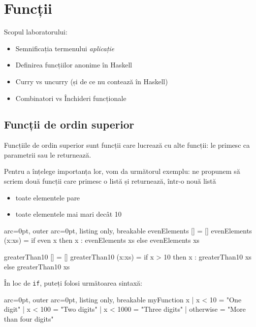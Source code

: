 \section*{ Funcții }

Scopul laboratorului:
\begin{itemize}
	\item  Semnificația termenului \textit{aplicație}
	\item  Definirea funcțiilor anonime în Haskell
	\item  Curry vs uncurry (și de ce nu contează în Haskell)
	\item  Combinatori vs Închideri funcționale
\end{itemize}
\subsection*{ Funcții de ordin superior }

Funcțiile de ordin superior sunt funcții care lucrează cu alte funcții: le primesc ca parametrii sau le returnează.

Pentru a înțelege importanța lor, vom da următorul exemplu: ne propunem să scriem două funcții care primesc o listă și returnează, într-o nouă listă
\begin{itemize}
	\item  toate elementele pare
	\item  toate elementele mai mari decât 10
\end{itemize}


\begin{tcblisting}{ arc=0pt, outer arc=0pt, listing only, breakable}
evenElements [] = []
evenElements (x:xs) = if even x
                      then x : evenElements xs
                      else evenElements xs
                      
greaterThan10 [] = []
greaterThan10 (x:xs) = if x > 10
                       then x : greaterThan10 xs
                       else greaterThan10 xs

\end{tcblisting}


\begin{tcolorbox}[colback=blue!10, colframe=blue!20]
În loc de \texttt{if}, puteți folosi următoarea sintaxă:

\begin{tcblisting}{ arc=0pt, outer arc=0pt, listing only, breakable}
myFunction x
        | x < 10    = "One digit"
        | x < 100   = "Two digits"
        | x < 1000  = "Three digits"
        | otherwise = "More than four digits"

\end{tcblisting}

\end{tcolorbox}

